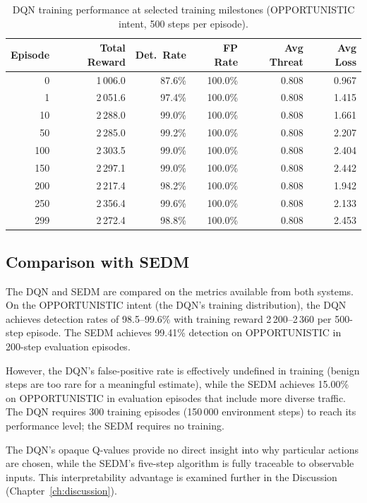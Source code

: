\begin{table}[ht]
  \centering
  \caption{DQN training performance at selected training milestones
           (OPPORTUNISTIC intent, 500 steps per episode).}
  \label{tab:dqn_milestones}
  \begin{tabular}{rrrrrr}
    \toprule
    Episode & Total Reward & Det.\ Rate & FP Rate & Avg Threat & Avg Loss \\
    \midrule
    0   & 1\,006.0 & 87.6\% & 100.0\% & 0.808 & 0.967 \\
    1   & 2\,051.6 & 97.4\% & 100.0\% & 0.808 & 1.415 \\
    10  & 2\,288.0 & 99.0\% & 100.0\% & 0.808 & 1.661 \\
    50  & 2\,285.0 & 99.2\% & 100.0\% & 0.808 & 2.207 \\
    100 & 2\,303.5 & 99.0\% & 100.0\% & 0.808 & 2.404 \\
    150 & 2\,297.1 & 99.0\% & 100.0\% & 0.808 & 2.442 \\
    200 & 2\,217.4 & 98.2\% & 100.0\% & 0.808 & 1.942 \\
    250 & 2\,356.4 & 99.6\% & 100.0\% & 0.808 & 2.133 \\
    299 & 2\,272.4 & 98.8\% & 100.0\% & 0.808 & 2.453 \\
    \bottomrule
  \end{tabular}
\end{table}

\subsection{Comparison with SEDM}

The DQN and SEDM are compared on the metrics available from both systems.
On the OPPORTUNISTIC intent (the DQN's training distribution), the DQN
achieves detection rates of 98.5--99.6\% with training reward
2\,200--2\,360 per 500-step episode.
The SEDM achieves 99.41\% detection on OPPORTUNISTIC in 200-step evaluation
episodes.

However, the DQN's false-positive rate is effectively undefined in training
(benign steps are too rare for a meaningful estimate), while the SEDM
achieves 15.00\% on OPPORTUNISTIC in evaluation episodes that include more
diverse traffic.
The DQN requires 300 training episodes (150\,000 environment steps) to
reach its performance level; the SEDM requires no training.

The DQN's opaque Q-values provide no direct insight into why particular
actions are chosen, while the SEDM's five-step algorithm is fully
traceable to observable inputs.
This interpretability advantage is examined further in the Discussion
(Chapter~\ref{ch:discussion}).

